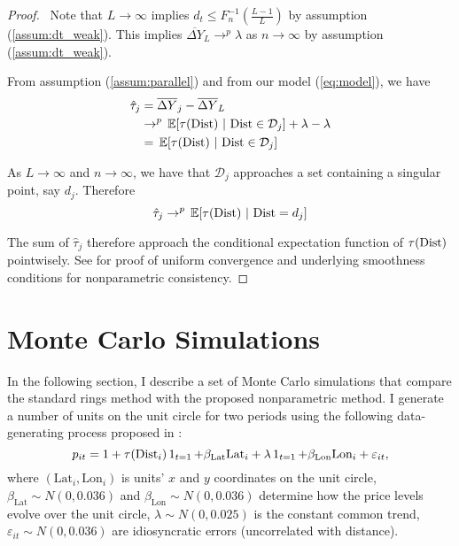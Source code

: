 \begin{proof}
  \ Note that $L \to \infty$ implies $d_t \leq F_n^{-1}(\frac{L-1}{L})$ by assumption (\ref{assum:dt_weak}). This implies $\overline{\Delta Y}_L \to^p \lambda$ as $n \to \infty$ by assumption (\ref{assum:dt_weak}). 
  
  From assumption (\ref{assum:parallel}) and from our model (\ref{eq:model}), we have
  \begin{align*}
    \hat{\tau}_j &= \overline{\Delta Y}_j - \overline{\Delta Y}_L \\
    &\to^p \expec{\tau(\dist)}{\dist \in \mathcal{D}_j} + \lambda - \lambda \\
    &= \expec{\tau(\dist)}{\dist \in \mathcal{D}_j}
  \end{align*}

  As $L \to \infty$ and $n \to \infty$, we have that $\mathcal{D}_j$ approaches a set containing a singular point, say $d_j$. Therefore 
  $$ 
    \hat{\tau}_j \to^p \expec{\tau(\dist)}{\dist = d_j}
  $$

  The sum of $\hat{\tau}_j$ therefore approach the conditional expectation function of $\tau(\text{Dist})$ pointwisely. See \cite{Cattaneo_Farrell_Feng_2019} for proof of uniform convergence and underlying smoothness conditions for nonparametric consistency.
\end{proof}


\section{Monte Carlo Simulations} \label{sec:monte}

In the following section, I describe a set of Monte Carlo simulations that compare the standard rings method with the proposed nonparametric method. I generate a number of units on the unit circle for two periods using the following data-generating process proposed in \cite{diamond2019wants}:
\begin{equation}\label{eq:monte}
p_{it} = 1 + \tau(\dist_i) \one_{t=1} + \beta_{\text{Lat}} \text{Lat}_i + \lambda \one_{t = 1} + \beta_{\text{Lon}} \text{Lon}_i + \varepsilon_{it},
\end{equation}
where $(\text{Lat}_i, \text{Lon}_i)$ is units' $x$ and $y$ coordinates on the unit circle, $\beta_{\text{Lat}} \sim N(0, 0.036)$ and $\beta_{\text{Lon}} \sim N(0, 0.036)$ determine how the price levels evolve over the unit circle, $\lambda \sim N(0,0.025)$ is the constant common trend, $\varepsilon_{it} \sim N(0, 0.036)$ are idiosyncratic errors (uncorrelated with distance). 

